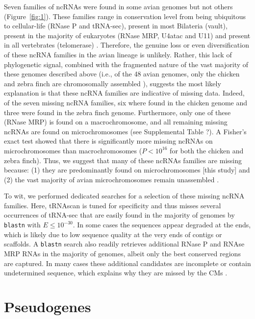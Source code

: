 \documentclass[10pt]{bmc_article}
\newenvironment{bmcformat}{\begin{raggedright}\baselineskip20pt\sloppy\setboolean{publ}{false}}{\end{raggedright}\baselineskip20pt\sloppy}
\begin{document}
\begin{bmcformat}
Seven families of ncRNAs were found in some avian genomes but not
others (Figure~\ref{fig:1}). These families range in conservation level
from being ubiquitous to cellular-life (RNase P and tRNA-sec), present
in most Bilateria (vault), present in the majority of eukaryotes
(RNase MRP, U4atac and U11) and present in all vertebrates
(telomerase) \cite{Hoeppner:2012}. Therefore, the genuine loss or even
diversification of these ncRNA families in the avian lineage is
unlikely. Rather, this lack of phylogenetic signal, combined with the
fragmented nature of the vast majority of these genomes described
above (i.e., of the 48 avian genomes, only the chicken and zebra finch
are chromosomally assembled \cite{birds:14,Warren:2010}), suggests the most likely
explanation is that these ncRNA families are indicative of missing
data. Indeed, of the seven missing ncRNA families, six where found in
the chicken genome and three were found in the zebra finch
genome. Furthermore, only one of these (RNase MRP) is found on a
macrochromosome, and all remaining missing ncRNAs are found on
microchromosomes (see Supplemental Table ?). A Fisher’s exact test
showed that there is significantly more missing ncRNAs on
microchromosomes than macrochromosomes ($P<10^{16}$ for both the
chicken and zebra finch). Thus, we suggest that many of
these ncRNAs families are missing because: (1) they are predominantly
found on microchromosomes [this study] and (2) the vast majority of
avian microchromosomes remain unassembled \cite{birds:14,Ellegren:2005}.

To wit, we performed dedicated searches for a selection of these
missing ncRNA families. Here, tRNAscan is tuned for specificity and
thus misses several occurrences of tRNA-sec that are easily found in
the majority of genomes by \texttt{blastn} with $E\le 10^{-30}$. In some cases the
sequences appear degraded at the ends, which is likely due to low
sequence quality at the very ends of contigs or scaffolds. A \texttt{blastn}
search also readily retrieves additional RNase P and RNAse MRP RNAs in
the majority of genomes, albeit only the best conserved regions are
captured. In many cases these additional candidates are incomplete or
contain undetermined sequence, which explains why they are missed by
the CMs \cite{Stadler:09b,Kolbe:2009}.



\section*{Pseudogenes}


\end{bmcformat}
\end{document}

